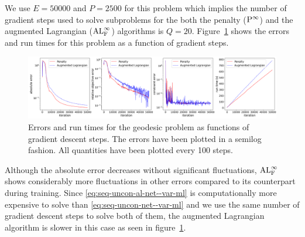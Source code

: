 We use $E=50000$ and $P=2500$ for this problem which implies the number of gradient steps used to solve subproblems for the both the penalty (${\rm P}^\infty$) and the augmented Lagrangian (${\rm AL}^\infty_{\rm F}$) algorithms is $Q=20$. Figure~\ref{fig:geo-error--var-ml} shows the errors and run times for this problem as a function of gradient steps.
\begin{figure}[!ht]
    \centering
\includegraphics[scale=0.32]{var-ml/plots/var-plots-sphere-geodesic-error.png}
    \caption{Errors and run times for the geodesic problem as functions of gradient descent steps. The errors have been plotted in a semilog fashion. All quantities have been plotted every 100 steps.}
    \label{fig:geo-error--var-ml}
\end{figure}
 Although the absolute error decreases without significant fluctuations, ${\rm AL}^\infty_{\rm F}$ shows considerably more fluctuations in other errors compared to its counterpart during training. Since \eqref{eq:seq-uncon-al-net--var-ml} is computationally more expensive to solve than \eqref{eq:seq-uncon-net--var-ml} and we use the same number of gradient descent steps to solve both of them, the augmented Lagrangian algorithm is slower in this case as seen in figure~\ref{fig:geo-error--var-ml}.

